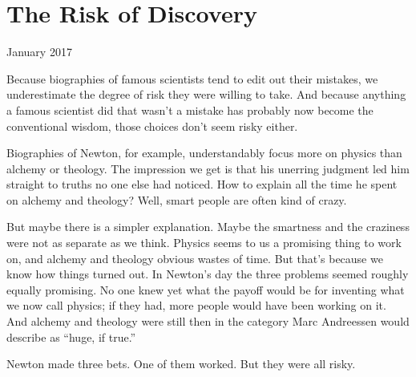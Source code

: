 \chapter{The Risk of Discovery}

January 2017

Because biographies of famous scientists tend to edit out their
mistakes, we underestimate the degree of risk they were willing to take.
And because anything a famous scientist did that wasn't a mistake has
probably now become the conventional wisdom, those choices don't seem
risky either.

Biographies of Newton, for example, understandably focus more on physics
than alchemy or theology. The impression we get is that his unerring
judgment led him straight to truths no one else had noticed. How to
explain all the time he spent on alchemy and theology? Well, smart
people are often kind of crazy.

But maybe there is a simpler explanation. Maybe the smartness and the
craziness were not as separate as we think. Physics seems to us a
promising thing to work on, and alchemy and theology obvious wastes of
time. But that's because we know how things turned out. In Newton's day
the three problems seemed roughly equally promising. No one knew yet
what the payoff would be for inventing what we now call physics; if they
had, more people would have been working on it. And alchemy and theology
were still then in the category Marc Andreessen would describe as
``huge, if true.''

Newton made three bets. One of them worked. But they were all risky.
